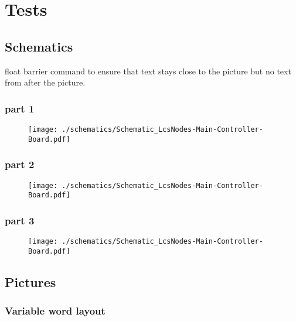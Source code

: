 \chapter{Tests}

\section{Schematics}

float barrier command to ensure that text stays close to the picture but no text from after the picture.

\subsection{part 1}

\begin{figure}[ht]
    \centering
    \texttt{[image: ./schematics/Schematic\_LcsNodes-Main-Controller-Board.pdf]}
\end{figure}

\FloatBarrier

\subsection{part 2}
\begin{figure}[ht]
    \centering
    \texttt{[image: ./schematics/Schematic\_LcsNodes-Main-Controller-Board.pdf]}
\end{figure}

\FloatBarrier

\subsection{part 3}
\begin{figure}[ht]
    \centering
    \texttt{[image: ./schematics/Schematic\_LcsNodes-Main-Controller-Board.pdf]}
\end{figure}

\FloatBarrier


\section{Pictures}

\subsection{Variable word layout}

